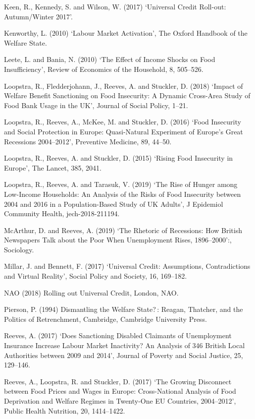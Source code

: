 \documentclass[12pt,article,oneside]{memoir}
\begin{document}
Keen, R., Kennedy, S. and Wilson, W. (2017) ‘Universal Credit Roll-out: Autumn/Winter 2017’.

Kenworthy, L. (2010) ‘Labour Market Activation’, The Oxford Handbook of the Welfare State.

Leete, L. and Bania, N. (2010) ‘The Effect of Income Shocks on Food Insufficiency’, Review of Economics of the Household, 8, 505–526.

Loopstra, R., Fledderjohann, J., Reeves, A. and Stuckler, D. (2018) ‘Impact of Welfare Benefit Sanctioning on Food Insecurity: A Dynamic Cross-Area Study of Food Bank Usage in the UK’, Journal of Social Policy, 1–21.

Loopstra, R., Reeves, A., McKee, M. and Stuckler, D. (2016) ‘Food Insecurity and Social Protection in Europe: Quasi-Natural Experiment of Europe’s Great Recessions 2004–2012’, Preventive Medicine, 89, 44–50.

Loopstra, R., Reeves, A. and Stuckler, D. (2015) ‘Rising Food Insecurity in Europe’, The Lancet, 385, 2041.

Loopstra, R., Reeves, A. and Tarasuk, V. (2019) ‘The Rise of Hunger among Low-Income Households: An Analysis of the Risks of Food Insecurity between 2004 and 2016 in a Population-Based Study of UK Adults’, J Epidemiol Community Health, jech-2018-211194.

McArthur, D. and Reeves, A. (2019) ‘The Rhetoric of Recessions: How British Newspapers Talk about the Poor When Unemployment Rises, 1896–2000’:, Sociology.

Millar, J. and Bennett, F. (2017) ‘Universal Credit: Assumptions, Contradictions and Virtual Reality’, Social Policy and Society, 16, 169–182.

NAO (2018) Rolling out Universal Credit, London, NAO.

Pierson, P. (1994) Dismantling the Welfare State? : Reagan, Thatcher, and the Politics of Retrenchment, Cambridge, Cambridge University Press.

Reeves, A. (2017) ‘Does Sanctioning Disabled Claimants of Unemployment Insurance Increase Labour Market Inactivity? An Analysis of 346 British Local Authorities between 2009 and 2014’, Journal of Poverty and Social Justice, 25, 129–146.

Reeves, A., Loopstra, R. and Stuckler, D. (2017) ‘The Growing Disconnect between Food Prices and Wages in Europe: Cross-National Analysis of Food Deprivation and Welfare Regimes in Twenty-One EU Countries, 2004–2012’, Public Health Nutrition, 20, 1414–1422.
\end{document}

